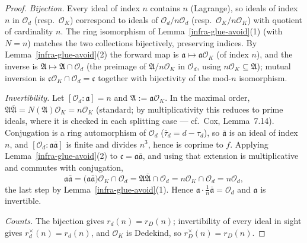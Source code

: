 \begin{proof}
  \emph{Bijection.} Every ideal of index $n$ contains $n$ (Lagrange), so ideals
  of index $n$ in $\mathcal{O}_d$ (resp.\ $\mathcal{O}_K$) correspond to ideals
  of $\mathcal{O}_d/n\mathcal{O}_d$ (resp.\ $\mathcal{O}_K/n\mathcal{O}_K$)
  with quotient of cardinality $n$. The ring isomorphism of
  Lemma~\ref{infra-glue-avoid}(1) (with $N = n$) matches the two collections
  bijectively, preserving indices. By Lemma~\ref{infra-glue-avoid}(2) the
  forward map is $\mathfrak{a} \mapsto \mathfrak{a}\mathcal{O}_K$ (of index
  $n$), and the inverse is
  $\mathfrak{A} \mapsto \mathfrak{A} \cap \mathcal{O}_d$ (the preimage of
  $\mathfrak{A}/n\mathcal{O}_K$ in $\mathcal{O}_d$, using
  $n\mathcal{O}_K \subseteq \mathfrak{A}$); mutual inversion is
  $\mathfrak{c}\mathcal{O}_K \cap \mathcal{O}_d = \mathfrak{c}$ together with
  bijectivity of the mod-$n$ isomorphism.

  \emph{Invertibility.} Let $[\mathcal{O}_d : \mathfrak{a}] = n$ and
  $\mathfrak{A} := \mathfrak{a}\mathcal{O}_K$. In the maximal order,
  $\mathfrak{A}\bar{\mathfrak{A}} = N(\mathfrak{A})\mathcal{O}_K =
  n\mathcal{O}_K$ (standard; by multiplicativity this reduces to prime ideals,
  where it is checked in each splitting case — cf.\ Cox, Lemma~7.14).
  Conjugation is a ring automorphism of $\mathcal{O}_d$
  ($\bar\tau_d = d - \tau_d$), so $\bar{\mathfrak{a}}$ is an ideal of index
  $n$, and $[\mathcal{O}_d : \mathfrak{a}\bar{\mathfrak{a}}]$ is finite and
  divides $n^3$, hence is coprime to $f$. Applying
  Lemma~\ref{infra-glue-avoid}(2) to
  $\mathfrak{c} = \mathfrak{a}\bar{\mathfrak{a}}$, and using that extension is
  multiplicative and commutes with conjugation,
  \[
    \mathfrak{a}\bar{\mathfrak{a}}
    = \bigl(\mathfrak{a}\bar{\mathfrak{a}}\bigr)\mathcal{O}_K \cap \mathcal{O}_d
    = \mathfrak{A}\bar{\mathfrak{A}} \cap \mathcal{O}_d
    = n\mathcal{O}_K \cap \mathcal{O}_d
    = n\mathcal{O}_d,
  \]
  the last step by Lemma~\ref{infra-glue-avoid}(1). Hence
  $\mathfrak{a} \cdot \frac{1}{n}\bar{\mathfrak{a}} = \mathcal{O}_d$ and
  $\mathfrak{a}$ is invertible.

  \emph{Counts.} The bijection gives $r_d(n) = r_D(n)$; invertibility of every
  ideal in sight gives $r_d^{\times}(n) = r_d(n)$, and $\mathcal{O}_K$ is
  Dedekind, so $r_D^{\times}(n) = r_D(n)$.
\end{proof}

